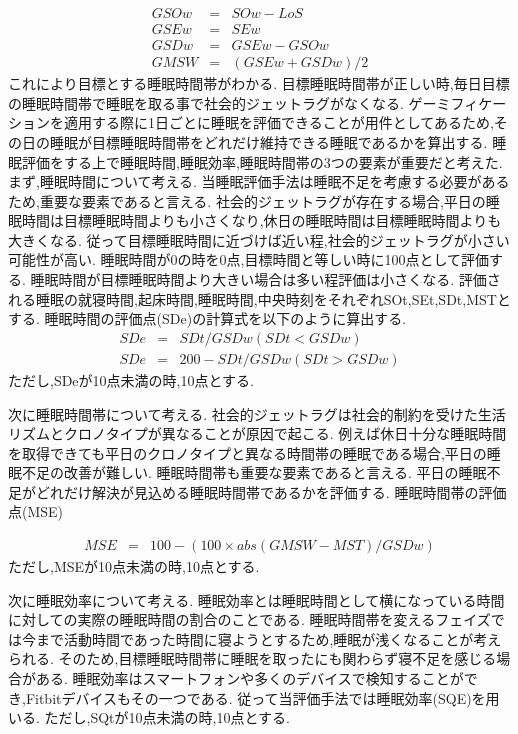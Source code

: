 \begin{eqnarray}
	GSOw & = & SOw - LoS \\
	GSEw & = & SEw \\
	GSDw & = & GSEw - GSOw \\
	GMSW & = & (GSEw + GSDw) / 2
\end{eqnarray}
これにより目標とする睡眠時間帯がわかる.
目標睡眠時間帯が正しい時,毎日目標の睡眠時間帯で睡眠を取る事で社会的ジェットラグがなくなる.
ゲーミフィケーションを適用する際に1日ごとに睡眠を評価できることが用件としてあるため,その日の睡眠が目標睡眠時間帯をどれだけ維持できる睡眠であるかを算出する.
睡眠評価をする上で睡眠時間,睡眠効率,睡眠時間帯の3つの要素が重要だと考えた.
まず,睡眠時間について考える.
当睡眠評価手法は睡眠不足を考慮する必要があるため,重要な要素であると言える.
社会的ジェットラグが存在する場合,平日の睡眠時間は目標睡眠時間よりも小さくなり,休日の睡眠時間は目標睡眠時間よりも大きくなる.
従って目標睡眠時間に近づけば近い程,社会的ジェットラグが小さい可能性が高い.
睡眠時間が0の時を0点,目標時間と等しい時に100点として評価する.
睡眠時間が目標睡眠時間より大きい場合は多い程評価は小さくなる.
評価される睡眠の就寝時間,起床時間,睡眠時間,中央時刻をそれぞれSOt,SEt,SDt,MSTとする.
睡眠時間の評価点(SDe)の計算式を以下のように算出する.
\begin{eqnarray}
	SDe & = &  SDt / GSDw (SDt < GSDw)\\
	SDe & = & 200 - SDt / GSDw (SDt > GSDw)
\end{eqnarray}
ただし,SDeが10点未満の時,10点とする.

次に睡眠時間帯について考える.
社会的ジェットラグは社会的制約を受けた生活リズムとクロノタイプが異なることが原因で起こる.
例えば休日十分な睡眠時間を取得できても平日のクロノタイプと異なる時間帯の睡眠である場合,平日の睡眠不足の改善が難しい.
睡眠時間帯も重要な要素であると言える.
平日の睡眠不足がどれだけ解決が見込める睡眠時間帯であるかを評価する.
睡眠時間帯の評価点(MSE)

\begin{eqnarray}
	MSE & = & 100 - (100 × abs(GMSW - MST) / GSDw)
\end{eqnarray}
ただし,MSEが10点未満の時,10点とする.

次に睡眠効率について考える.
睡眠効率とは睡眠時間として横になっている時間に対しての実際の睡眠時間の割合のことである.
睡眠時間帯を変えるフェイズでは今まで活動時間であった時間に寝ようとするため,睡眠が浅くなることが考えられる.
そのため,目標睡眠時間帯に睡眠を取ったにも関わらず寝不足を感じる場合がある.
睡眠効率はスマートフォンや多くのデバイスで検知することができ,Fitbitデバイスもその一つである.
従って当評価手法では睡眠効率(SQE)を用いる.
ただし,SQtが10点未満の時,10点とする.


